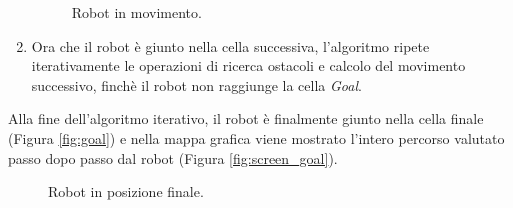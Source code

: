 \documentclass[english]{article}
\begin{document}
\begin{enumerate}
\begin{figure}[!ht]
\centering
{}
\caption{Robot in movimento.}
\end{figure}
\item Ora che il robot è giunto nella cella successiva, l'algoritmo ripete iterativamente le operazioni di ricerca ostacoli e calcolo del movimento successivo, finchè il robot non raggiunge la cella \textit{Goal}.
\end{enumerate}
Alla fine dell'algoritmo iterativo, il robot è finalmente giunto nella cella finale (Figura \ref{fig:goal}) e nella mappa grafica viene mostrato l'intero percorso valutato passo dopo passo dal robot (Figura \ref{fig:screen_goal}). 
\begin{figure}[!ht]
\centering
{}
\caption{Robot in posizione finale.}
\end{figure}
\end{document}
